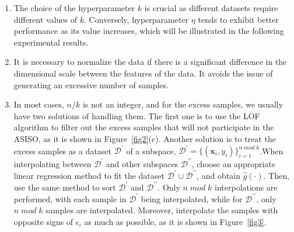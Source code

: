 \documentclass[sn-mathphys,Numbered]{sn-jnl}%
\theoremstyle{thmstyleone}%
\theoremstyle{thmstyletwo}%
\theoremstyle{thmstylethree}%
\begin{document}
\begin{enumerate}[2.]

\item The choice of the hyperparameter $k$ is crucial as different datasets require different values of $k$. Conversely, hyperparameter $\eta$ tends to exhibit better performance as its value increases, which will be illustrated in the following experimental results.

\item It is necessary to normalize the data if there is a significant difference in the dimensional scale between the features of the data. It avoids the issue of generating an excessive number of samples.

\item In most cases, $n/k$ is not an integer, and for the excess samples, we usually have two solutions of handling them. The first one is to use the LOF algorithm \cite{bib26} to filter out the excess samples that will not participate in the ASISO, as it is shown in Figure~\ref{fig2}(c). Another solution is to treat the excess samples as a dataset $\mathcal{D}^\prime$ of a subspace, $\mathcal{D}^\prime=\{(\boldsymbol{x}_i,y_i)\}_{{i=1}}^{{n\;mod\;k}}$.When interpolating between $\mathcal{D}^\prime$ and other subspaces $\mathcal{D}^{\prime\prime}$, choose an appropriate linear regression method to fit the dataset $\mathcal{D}^\prime\cup\mathcal{D}^{\prime\prime}$, and obtain $\hat{g}(\cdot)$. Then, use the same method to sort $\mathcal{D}^\prime$ and $\mathcal{D}^{\prime\prime}$. Only $n\;mod\;k$ interpolations are performed, with each sample in $\mathcal{D}^\prime$ being interpolated, while for $\mathcal{D}^{\prime\prime}$, only $n\;mod\;k$ samples are interpolated. Moreover, interpolate the samples with opposite signs of $\epsilon_i$ as much as possible, as it is shown in Figure~\ref{fig3}.

\end{enumerate}
\end{document}
